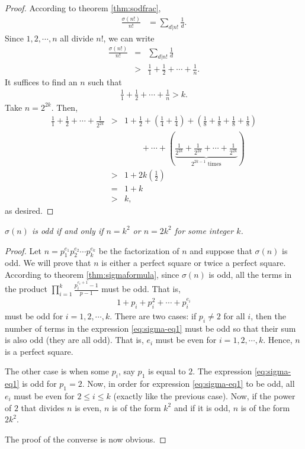 \documentclass[12pt]{subfile}
\begin{document}
	\begin{proof}
		According to theorem \ref{thm:sodfrac},
			\begin{align*}
				\frac{\sigma(n!)}{n!} &= \sum_{d|n!} \frac{1}{d}.
			\end{align*}
		Since $1,2,\cdots,n$ all divide $n!$, we can write
			\begin{eqnarray*}
				\frac{\sigma(n!)}{n!} &=& \sum_{d|n!} \frac{1}{d}\\
									  &>& \frac{1}{1} + \frac{1}{2}+ \cdots + \frac{1}{n}.
			\end{eqnarray*}
		It suffices to find an $n$ such that
			\begin{align*}
				\frac{1}{1} + \frac{1}{2}+ \cdots + \frac{1}{n} > k.
			\end{align*}
		Take $n=2^{2k}$. Then,
			\begin{eqnarray*}
				\frac{1}{1} + \frac{1}{2}+ \cdots + \frac{1}{2^{2k}}
					&>& 1 + \frac{1}{2} + \left(\frac{1}{4} + \frac{1}{4}\right) + \left(\frac{1}{8} + \frac{1}{8}+\frac{1}{8} + \frac{1}{8}\right)\\
					&\phantom{>}& \qquad  + \cdots + \left(\underbrace{\frac{1}{2^{2k}}+\frac{1}{2^{2k}}+\cdots+\frac{1}{2^{2k}}}_{2^{2k-1} \text{ times}}\right)\\
					&>& 1+2k\left(\frac{1}{2}\right)\\
					&=& 1+k\\
					&>& k,
			\end{eqnarray*}
		as desired.
	\end{proof}

	\begin{theorem}\slshape\label{thm:oddsigma}
		$\sigma (n)$ is odd if and only if $n=k^2$ or $n=2k^2$ for some integer $k$.
	\end{theorem}

	\begin{proof}
		Let $n=p_1^{e_1}p_2^{e_2}\cdots p_k^{e_k}$ be the factorization of $n$ and suppose that $\sigma(n)$ is odd. We will prove that $n$ is either a perfect square or twice a perfect square. According to theorem \ref{thm:sigmaformula}, since $\sigma(n)$ is odd, all the terms in the product $\prod\limits_{i=1}^{k} \frac{p_i^{e_i+1}-1}{p-1}$ must be odd. That is,
		\begin{align}
			1+p_i+p_i^2+\cdots+p_i^{e_i} \label{eq:sigma-eq1}
		\end{align}
		must be odd for $i=1,2,\cdots,k$. There are two cases: if $p_i\neq 2$ for all $i$, then the number of terms in the expression \ref{eq:sigma-eq1} must be odd so that their sum is also odd (they are all odd). That is, $e_i$ must be even for $i=1,2,\cdots,k$. Hence, $n$ is a perfect square.

		The other case is when some $p_i$, say $p_1$ is equal to $2$. The expression \ref{eq:sigma-eq1} is odd for $p_1=2$. Now, in order for expression \ref{eq:sigma-eq1} to be odd, all $e_i$ must be even for $2 \leq i \leq k$ (exactly like the previous case). Now, if the power of $2$ that divides $n$ is even, $n$ is of the form $k^2$ and if it is odd, $n$ is of the form $2k^2$.

		The proof of the converse is now obvious.
	\end{proof}
\end{document}

